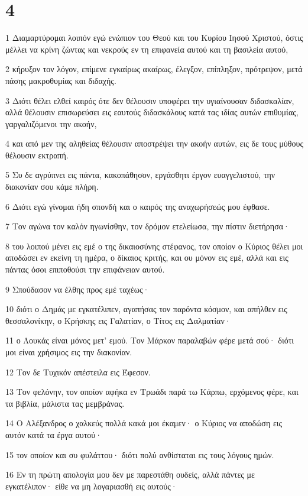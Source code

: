 \chapter{4}

\par 1 Διαμαρτύρομαι λοιπόν εγώ ενώπιον του Θεού και του Κυρίου Ιησού Χριστού, όστις μέλλει να κρίνη ζώντας και νεκρούς εν τη επιφανεία αυτού και τη βασιλεία αυτού,
\par 2 κήρυξον τον λόγον, επίμενε εγκαίρως ακαίρως, έλεγξον, επίπληξον, πρότρεψον, μετά πάσης μακροθυμίας και διδαχής.
\par 3 Διότι θέλει ελθεί καιρός ότε δεν θέλουσιν υποφέρει την υγιαίνουσαν διδασκαλίαν, αλλά θέλουσιν επισωρεύσει εις εαυτούς διδασκάλους κατά τας ιδίας αυτών επιθυμίας, γαργαλιζόμενοι την ακοήν,
\par 4 και από μεν της αληθείας θέλουσιν αποστρέψει την ακοήν αυτών, εις δε τους μύθους θέλουσιν εκτραπή.
\par 5 Συ δε αγρύπνει εις πάντα, κακοπάθησον, εργάσθητι έργον ευαγγελιστού, την διακονίαν σου κάμε πλήρη.
\par 6 Διότι εγώ γίνομαι ήδη σπονδή και ο καιρός της αναχωρήσεώς μου έφθασε.
\par 7 Τον αγώνα τον καλόν ηγωνίσθην, τον δρόμον ετελείωσα, την πίστιν διετήρησα·
\par 8 του λοιπού μένει εις εμέ ο της δικαιοσύνης στέφανος, τον οποίον ο Κύριος θέλει μοι αποδώσει εν εκείνη τη ημέρα, ο δίκαιος κριτής, και ου μόνον εις εμέ, αλλά και εις πάντας όσοι επιποθούσι την επιφάνειαν αυτού.
\par 9 Σπούδασον να έλθης προς εμέ ταχέως·
\par 10 διότι ο Δημάς με εγκατέλιπεν, αγαπήσας τον παρόντα κόσμον, και απήλθεν εις θεσσαλονίκην, ο Κρήσκης εις Γαλατίαν, ο Τίτος εις Δαλματίαν·
\par 11 ο Λουκάς είναι μόνος μετ' εμού. Τον Μάρκον παραλαβών φέρε μετά σού· διότι μοι είναι χρήσιμος εις την διακονίαν.
\par 12 Τον δε Τυχικόν απέστειλα εις Έφεσον.
\par 13 Τον φελόνην, τον οποίον αφήκα εν Τρωάδι παρά τω Κάρπω, ερχόμενος φέρε, και τα βιβλία, μάλιστα τας μεμβράνας.
\par 14 Ο Αλέξανδρος ο χαλκεύς πολλά κακά μοι έκαμεν· ο Κύριος να αποδώση εις αυτόν κατά τα έργα αυτού·
\par 15 τον οποίον και συ φυλάττου· διότι πολύ ανθίσταται εις τους λόγους ημών.
\par 16 Εν τη πρώτη απολογία μου δεν με παρεστάθη ουδείς, αλλά πάντες με εγκατέλιπον· είθε να μη λογαριασθή εις αυτούς·
